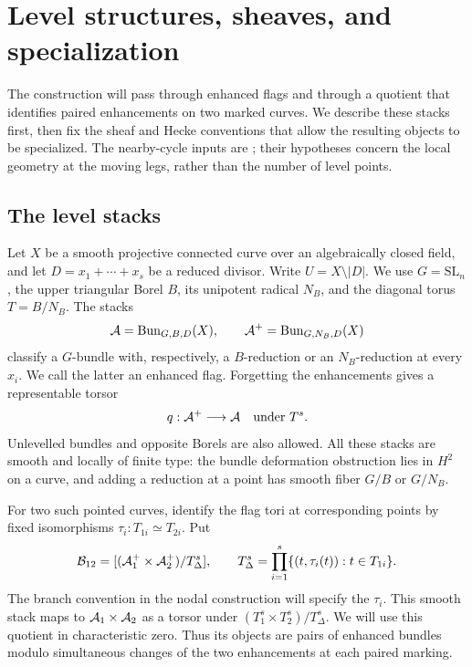\section{Level structures, sheaves, and specialization}
\label{found:section}

The construction will pass through enhanced flags and through a quotient
that identifies paired enhancements on two marked curves.  We describe these stacks
first, then fix the sheaf and Hecke conventions that allow the resulting
objects to be specialized.  The nearby-cycle inputs are
\cite[Propositions~2.1 and~5.1]{CT}; their hypotheses concern the local
geometry at the moving legs, rather than the number of level points.

\subsection{The level stacks}
\label{found:level-stacks}

Let $X$ be a smooth projective connected curve over an algebraically
closed field, and let $D=x_1+\cdots+x_s$ be a reduced divisor.  Write
$U=X\setminus |D|$.  We use $G=\mathrm{SL}_n$, the upper triangular
Borel $B$, its unipotent radical $N_B$, and the diagonal torus
$T=B/N_B$.  The stacks
\[
 \mathcal A=\operatorname{Bun}_{G,B,D}(X),\qquad
 \mathcal A^+=\operatorname{Bun}_{G,N_B,D}(X)
\]
classify a $G$-bundle with, respectively, a $B$-reduction or an
$N_B$-reduction at every $x_i$.  We call the latter an enhanced flag.
Forgetting the enhancements gives a representable torsor
\begin{equation}\label{found:torsor}
                         q:\mathcal A^+\longrightarrow\mathcal A
                         \quad\text{under }T^s.
\end{equation}
Unlevelled bundles and opposite Borels are also allowed.  All these
stacks are smooth and locally of finite type: the bundle deformation
obstruction lies in $H^2$ on a curve, and adding a reduction at a point
has smooth fiber $G/B$ or $G/N_B$.

For two such pointed curves, identify the flag tori at corresponding
points by fixed isomorphisms $\tau_i:T_{1i}\simeq T_{2i}$.  Put
\begin{equation}\label{found:quotient}
 \mathcal B_{12}=[(\mathcal A_1^+\times\mathcal A_2^+)/T^s_\Delta],\qquad
 T^s_\Delta=\prod_{i=1}^s\{(t,\tau_i(t)):t\in T_{1i}\}.
\end{equation}
The branch convention in the nodal construction will specify the
$\tau_i$.  This smooth stack maps to $\mathcal A_1\times\mathcal A_2$ as a torsor
under $(T_1^s\times T_2^s)/T^s_\Delta$.  We will use this quotient in
characteristic zero.  Thus its objects are pairs of enhanced bundles
modulo simultaneous changes of the two enhancements at each paired
marking.

